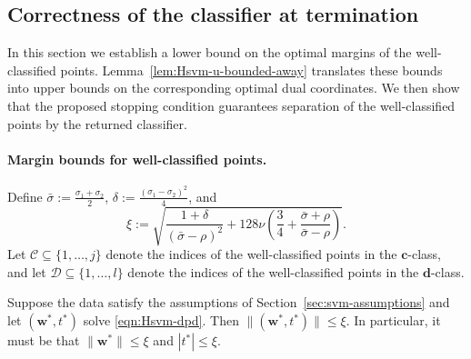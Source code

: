 \documentclass[twoside,11pt]{article}
\renewcommand{\c}{\bm{c}}
\renewcommand{\d}{\bm{d}}
\newcommand\w{\bm{w}}
\newcommand\CC{\mathcal{C}}
\newcommand\DD{\mathcal{D}}
\begin{document}
\subsection{Correctness of the classifier at termination}
\label{sec:termination-correctness}
In this section we establish a lower bound on the optimal margins of the well-classified points. Lemma~\ref{lem:Hsvm-u-bounded-away} translates these bounds into upper bounds on the corresponding optimal dual coordinates. We then show that the proposed stopping condition guarantees separation of the well-classified points by the returned classifier.

\paragraph{Margin bounds for well-classified points.}
Define $\bar{\sigma} := \frac{\sigma_1 + \sigma_2}{2}$, $\delta := \frac{(\sigma_1 - \sigma_2)^2}{4}$, and
\[
  \xi := \sqrt{\frac{1+\delta}{(\bar{\sigma} - \rho)^2} + 128\nu\left(\frac{3}{4} + \frac{\bar{\sigma} + \rho}{\bar{\sigma} - \rho}\right)}.
\]
Let $\CC \subseteq \{1,\hdots,j\}$ denote the indices of the well-classified points in the $\c$-class, and let $\DD \subseteq \{1,\hdots,l\}$ denote the indices of the well-classified points in the $\d$-class.
\begin{lemma} \label{lem:Hsvm-wstar-bound}
  Suppose the data satisfy the assumptions of Section~\ref{sec:svm-assumptions} and let $(\w^*,t^*)$ solve \eqref{eqn:Hsvm-dpd}. Then $\lVert(\w^*,t^*)\rVert \leq \xi$. In particular, it must be that $\|\w^*\| \leq \xi$ and $|t^*| \leq \xi$.
\end{lemma}
\end{document}
